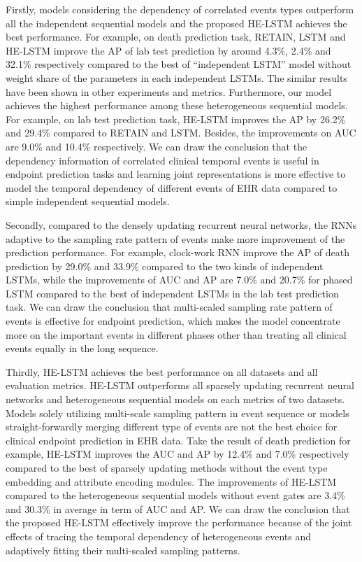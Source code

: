 \documentclass[letterpaper]{article} %
\begin{document}
Firstly, models considering the dependency of correlated events types outperform all the independent sequential models and the proposed HE-LSTM achieves the best performance. For example,  on death prediction task,  RETAIN, LSTM and HE-LSTM improve the AP of lab test prediction by around 4.3\%, 2.4\% and 32.1\% respectively compared to the best of ``independent LSTM'' model without weight share of the parameters in each independent LSTMs. The similar results have been shown in other experiments and metrics. Furthermore, our model achieves the highest performance among these heterogeneous sequential models. For example, on lab test prediction task, HE-LSTM improves the AP by 26.2\% and 29.4\% compared to  RETAIN and LSTM. Besides, the improvements on AUC are 9.0\% and 10.4\% respectively. We can draw the conclusion that the dependency information of correlated clinical temporal events is useful in endpoint prediction tasks and learning joint representations is more effective to model the temporal dependency of different events of EHR data compared to simple independent sequential models.

Secondly, compared to the densely updating recurrent neural networks, the RNNs adaptive to the sampling rate pattern of events make more improvement of the prediction performance. 
For example, clock-work RNN  improve the AP of death prediction by 29.0\% and 33.9\% compared to the two kinds of independent LSTMs, while the improvements of AUC and AP are 7.0\% and 20.7\% for phased LSTM compared to the best of independent LSTMs in the lab test prediction task.
We can draw the conclusion that multi-scaled sampling rate pattern of events is effective for endpoint prediction, which makes the model concentrate more on the important events in different phases other than treating all clinical events equally in the long sequence.

Thirdly,  HE-LSTM achieves the best performance on all datasets and all evaluation metrics. HE-LSTM outperforms all sparsely updating recurrent neural networks and heterogeneous sequential models on each metrics of two datasets. 
Models solely utilizing multi-scale sampling pattern in event sequence or models straight-forwardly merging different type of events are not the best choice for clinical endpoint prediction in EHR data. 
Take the result of death prediction for example, HE-LSTM improves the AUC and AP by 12.4\% and 7.0\% respectively compared to the best of sparsely updating  methods without the event type embedding and attribute encoding modules. 
The improvements of HE-LSTM compared to the heterogeneous sequential models without event gates are 3.4\% and 30.3\% in average in term of AUC and AP. 
We can draw the conclusion that the proposed HE-LSTM effectively improve the performance because of the joint effects of tracing the temporal dependency of heterogeneous events and adaptively fitting their multi-scaled sampling patterns.
\end{document}
